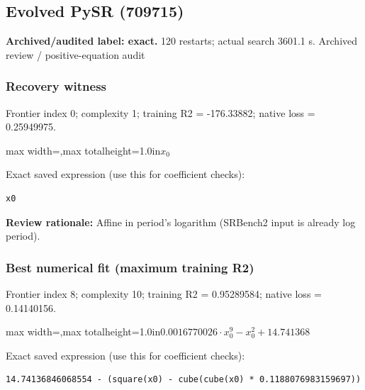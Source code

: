 \documentclass[10pt,letterpaper,landscape]{article}
\begin{document}
\begin{minipage}[t]{0.485\textwidth}
\subsection*{Evolved PySR (709715)}
\textbf{Archived/audited label: exact.} 120 restarts; actual search 3601.1 s.
{\small Archived review / positive-equation audit}
\subsubsection*{Recovery witness}
Frontier index 0; complexity 1; training R2 = -176.33882; native loss = 0.25949975.
\begin{center}\begin{adjustbox}{max width=\linewidth,max totalheight=1.0in}$\displaystyle x_{0}$\end{adjustbox}\end{center}
{\scriptsize Exact saved expression (use this for coefficient checks):}
\begin{lstlisting}
x0
\end{lstlisting}
{\small\textbf{Review rationale:} Affine in period's logarithm (SRBench2 input is already log period).}
\subsubsection*{Best numerical fit (maximum training R2)}
Frontier index 8; complexity 10; training R2 = 0.95289584; native loss = 0.14140156.
\begin{center}\begin{adjustbox}{max width=\linewidth,max totalheight=1.0in}$\displaystyle 0.0016770026 \cdot x_{0}^{9} - x_{0}^{2} + 14.741368$\end{adjustbox}\end{center}
{\scriptsize Exact saved expression (use this for coefficient checks):}
\begin{lstlisting}
14.74136846068554 - (square(x0) - cube(cube(x0) * 0.1188076983159697))
\end{lstlisting}
\end{minipage}
\clearpage{}\label{leavitt-10008}
\end{document}
